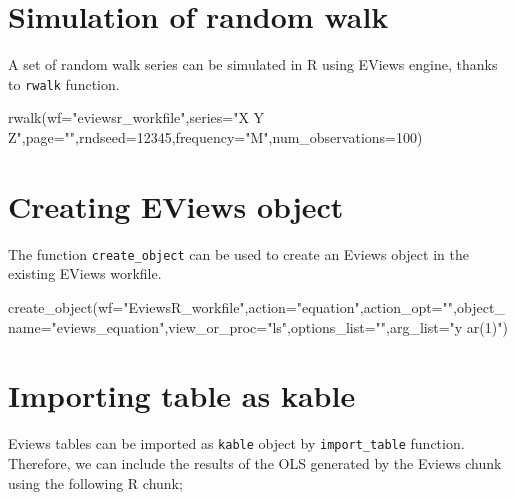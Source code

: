 \documentclass[
]{article}
\newenvironment{Shaded}{\begin{snugshade}}{\end{snugshade}}
\newcommand{\AttributeTok}[1]{\textcolor[rgb]{0.77,0.63,0.00}{#1}}
\newcommand{\DecValTok}[1]{\textcolor[rgb]{0.00,0.00,0.81}{#1}}
\newcommand{\FunctionTok}[1]{\textcolor[rgb]{0.00,0.00,0.00}{#1}}
\newcommand{\NormalTok}[1]{#1}
\newcommand{\StringTok}[1]{\textcolor[rgb]{0.31,0.60,0.02}{#1}}
\begin{document}
\hypertarget{simulation-of-random-walk}{%
\section{Simulation of random walk}\label{simulation-of-random-walk}}

A set of random walk series can be simulated in R using EViews engine, thanks to \texttt{rwalk} function.

\begin{Shaded}
\begin{Highlighting}[]
\FunctionTok{rwalk}\NormalTok{(}\AttributeTok{wf=}\StringTok{"eviewsr\_workfile"}\NormalTok{,}\AttributeTok{series=}\StringTok{"X Y Z"}\NormalTok{,}\AttributeTok{page=}\StringTok{""}\NormalTok{,}\AttributeTok{rndseed=}\DecValTok{12345}\NormalTok{,}\AttributeTok{frequency=}\StringTok{"M"}\NormalTok{,}\AttributeTok{num\_observations=}\DecValTok{100}\NormalTok{)}
\end{Highlighting}
\end{Shaded}

\hypertarget{creating-eviews-object}{%
\section{Creating EViews object}\label{creating-eviews-object}}

The function \texttt{create\_object} can be used to create an Eviews object in the existing EViews workfile.

\begin{Shaded}
\begin{Highlighting}[]
\FunctionTok{create\_object}\NormalTok{(}\AttributeTok{wf=}\StringTok{"EviewsR\_workfile"}\NormalTok{,}\AttributeTok{action=}\StringTok{"equation"}\NormalTok{,}\AttributeTok{action\_opt=}\StringTok{""}\NormalTok{,}\AttributeTok{object\_name=}\StringTok{"eviews\_equation"}\NormalTok{,}\AttributeTok{view\_or\_proc=}\StringTok{"ls"}\NormalTok{,}\AttributeTok{options\_list=}\StringTok{""}\NormalTok{,}\AttributeTok{arg\_list=}\StringTok{"y ar(1)"}\NormalTok{)}
\end{Highlighting}
\end{Shaded}

\hypertarget{importing-table-as-kable}{%
\section{Importing table as kable}\label{importing-table-as-kable}}

Eviews tables can be imported as \texttt{kable} object by \texttt{import\_table} function. Therefore, we can include the results of the OLS generated by the Eviews chunk using the following R chunk;
\end{document}
